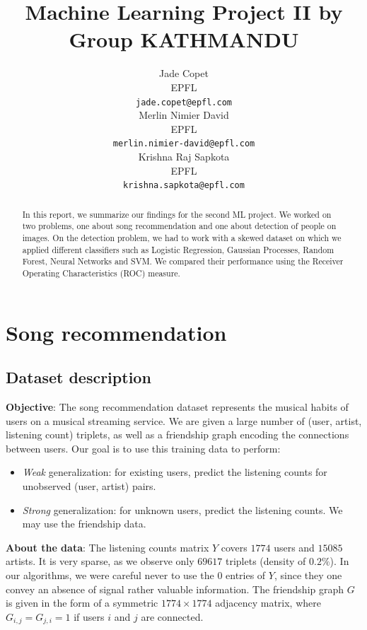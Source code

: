 \documentclass{article}
\title{Machine Learning Project II by Group KATHMANDU}
\author{
  Jade Copet\\
  EPFL \\
  \texttt{jade.copet@epfl.com} \\
  \And
  Merlin Nimier David\\
  EPFL \\
  \texttt{merlin.nimier-david@epfl.com} \\
  \And
  Krishna Raj Sapkota\\
  EPFL \\
  \texttt{krishna.sapkota@epfl.com} \\
}
\begin{document}
\maketitle



\begin{abstract}
 In this report, we summarize our findings for the second ML project. We worked on two problems, one about song recommendation and one about detection of people on images. On the detection problem, we had to work with a skewed dataset on which we applied different classifiers such as Logistic Regression, Gaussian Processes, Random Forest, Neural Networks and SVM. We compared their performance using the Receiver Operating Characteristics (ROC) measure.
\end{abstract}

\section{Song recommendation}

  \subsection{Dataset description}
  \textbf{Objective}: The song recommendation dataset represents the musical habits of users on a musical streaming service. We are given a large number of (user, artist, listening count) triplets, as well as a friendship graph encoding the connections between users. Our goal is to use this training data to perform:

  \begin{itemize}
    \item \textit{Weak} generalization: for existing users, predict the listening counts for unobserved (user, artist) pairs.
    \item \textit{Strong} generalization: for unknown users, predict the listening counts. We may use the friendship data.
  \end{itemize}

  \textbf{About the data}: The listening counts matrix $Y$ covers $1774$ users and $15085$ artists. It is very sparse, as we observe only $69617$ triplets (density of $0.2\%$). In our algorithms, we were careful never to use the $0$ entries of $Y$, since they one convey an absence of signal rather valuable information. The friendship graph $G$ is given in the form of a symmetric $1774 \times 1774$ adjacency matrix, where $G_{i, j} = G_{j, i} = 1$ if users $i$ and $j$ are connected.\\
\end{document}
